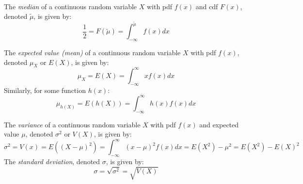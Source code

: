\documentclass[letterpaper,12pt,fleqn]{article}
\newcommand{\med}{\tilde{\mu}}
\renewcommand{\o}{\sigma}
\begin{document}
\begin{definition}[Median]
  The \emph{median} of a continuous random variable \(X\) with pdf \(f(x)\) and cdf \(F(x)\), denoted \(\med\), is
  given by:
  \[\frac{1}{2}=F(\med)=\int_{-\infty}^{\med}f(x)dx\]
\end{definition}

\begin{definition}
  The \emph{expected value (mean)} of a continuous random variable \(X\) with pdf \(f(x)\), denoted \(\mu_X\) or \(E(X)\), is
  given by:
  \[\mu_X=E(X)=\int_{-\infty}^{\infty}xf(x)dx\]
  Similarly, for some function \(h(x)\):
  \[\mu_{h(X)}=E(h(X))=\int_{-\infty}^{\infty}h(x)f(x)dx\]
\end{definition}

\begin{definition}[Variance]
  The \emph{variance} of a continuous random variable \(X\) with pdf \(f(x)\) and expected value \(\mu\), denoted \(\o^2\) or
  \(V(X)\), is given by:
  \[\o^2=V(x)=E((X-\mu)^2)=\int_{-\infty}^{\infty}(x-\mu)^2f(x)dx=E(X^2)-\mu^2=E(X^2)-E(X)^2\]
  The \emph{standard deviation}, denoted \(\o\), is given by:
  \[\o=\sqrt{\o^2}=\sqrt{V(X)}\]
\end{definition}

\bigskip
\end{document}
